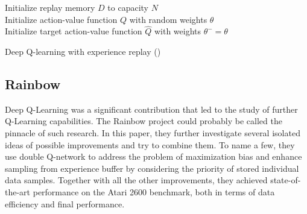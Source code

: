 \begin{algorithm}
  Initialize replay memory $D$ to capacity $N$ \\
  Initialize action-value function $Q$ with random weights $\theta$ \\
  Initialize target action-value function $\hat{Q}$ with weights $\theta^- = \theta $\\
  
  \caption{Deep Q-learning with experience replay (\cite{Atari})}
  \label{DeepQLearning}
\end{algorithm}

\subsection*{Rainbow}
Deep Q-Learning was a significant contribution that led to the study of further Q-Learning capabilities.
The Rainbow project \cite{Rainbow} could probably be called the pinnacle of such research.
In this paper, they further investigate several isolated ideas of possible improvements and try to combine them.
To name a few, they use double Q-network to address the problem of maximization bias and enhance sampling from experience buffer by considering the priority of stored individual data samples.
Together with all the other improvements, they achieved state-of-the-art performance on the Atari 2600 benchmark, both in terms of data efficiency and final performance.







